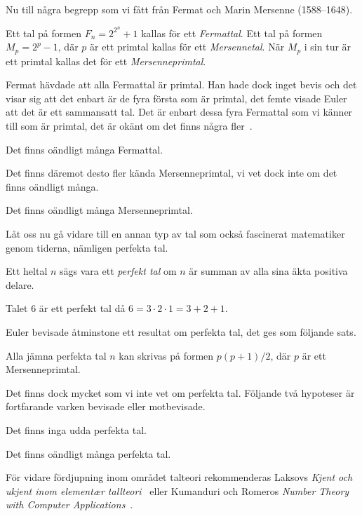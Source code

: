 Nu till några begrepp som vi fått från Fermat och Marin Mersenne (1588--1648).
\begin{definition}
  Ett tal på formen \(F_n = 2^{2^n} + 1\) kallas för ett \emph{Fermattal}.
  Ett tal på formen \(M_p = 2^p - 1\), där \(p\) är ett primtal kallas för ett 
  \emph{Mersennetal}.
  När \(M_p\) i sin tur är ett primtal kallas det för ett 
  \emph{Mersenneprimtal}.
\end{definition}
Fermat hävdade att alla Fermattal är primtal.
Han hade dock inget bevis och det visar sig att det enbart är de fyra första 
som är primtal, det femte visade Euler att det är ett sammansatt tal.
Det är enbart dessa fyra Fermattal som vi känner till som är primtal, det är 
okänt om det finns några fler~\cite{Laksov2005kou}.
\begin{conjecture}
  Det finns oändligt många Fermattal.
\end{conjecture}
Det finns däremot desto fler kända Mersenneprimtal, vi vet dock inte om det 
finns oändligt många.
\begin{conjecture}
  Det finns oändligt många Mersenneprimtal.
\end{conjecture}

Låt oss nu gå vidare till en annan typ av tal som också fascinerat matematiker 
genom tiderna, nämligen perfekta tal.
\begin{definition}
  Ett heltal \(n\) sägs vara ett \emph{perfekt tal} om \(n\) 
  är summan av alla sina äkta positiva delare.
\end{definition}
\begin{example}
  Talet \(6\) är ett perfekt tal då \(6 = 3\cdot 2\cdot 1 = 3 + 2 + 1\).
\end{example}

Euler bevisade åtminstone ett resultat om perfekta tal, det ges som följande 
sats.
\begin{theorem}
  Alla jämna perfekta tal \(n\) kan skrivas på formen \(p(p + 1)/2\), där \(p\) 
  är ett Mersenneprimtal.
\end{theorem}
Det finns dock mycket som vi inte vet om perfekta tal.
Följande två hypoteser är fortfarande varken bevisade eller motbevisade.
\begin{conjecture}
  Det finns inga udda perfekta tal.
\end{conjecture}
\begin{conjecture}
  Det finns oändligt många perfekta tal.
\end{conjecture}

För vidare fördjupning inom området talteori rekommenderas Laksovs \emph{Kjent 
  och ukjent inom element\ae{}r tallteori}~\cite{Laksov2005kou} eller Kumanduri 
och Romeros \emph{Number Theory with Computer 
  Applications}~\cite{Kumanduri1998ntw}.
